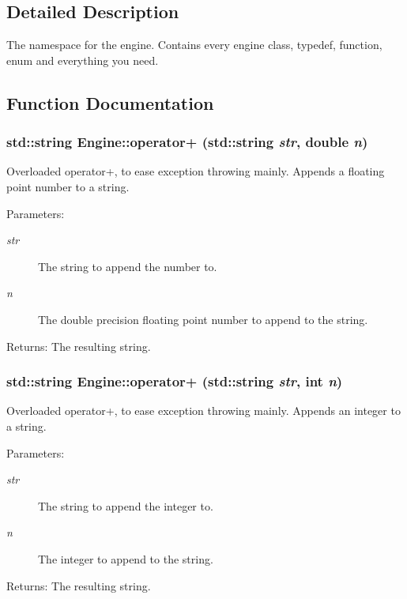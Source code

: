 \subsection{Detailed Description}
The namespace for the engine. Contains every engine class, typedef, function, enum and everything you need. 

\subsection{Function Documentation}
\subsubsection{\setlength{\rightskip}{0pt plus 5cm}std::string Engine::operator+ (std::string {\em str}, double {\em n})\hspace{0.3cm}{\tt  [inline]}}\label{namespaceEngine_35dbb8a9208f2756b4f54e0fd8740b79}


Overloaded operator+, to ease exception throwing mainly. Appends a floating point number to a string. \begin{Desc}
\item[Parameters:]
\begin{description}
\item[{\em str}]The string to append the number to. \item[{\em n}]The double precision floating point number to append to the string. \end{description}
\end{Desc}
\begin{Desc}
\item[Returns:]The resulting string. \end{Desc}
\subsubsection{\setlength{\rightskip}{0pt plus 5cm}std::string Engine::operator+ (std::string {\em str}, int {\em n})\hspace{0.3cm}{\tt  [inline]}}\label{namespaceEngine_cda49c3bdf1eb73e8877469b5c01cfbb}


Overloaded operator+, to ease exception throwing mainly. Appends an integer to a string. \begin{Desc}
\item[Parameters:]
\begin{description}
\item[{\em str}]The string to append the integer to. \item[{\em n}]The integer to append to the string. \end{description}
\end{Desc}
\begin{Desc}
\item[Returns:]The resulting string. \end{Desc}

